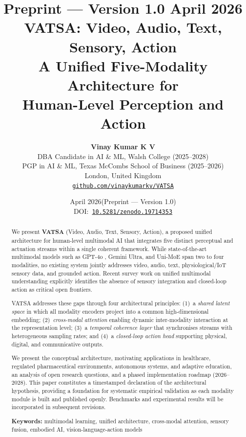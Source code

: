 \documentclass[11pt,a4paper]{article}
\title{%
  \vspace{-1em}
  {\large\textcolor{vatsa-gray}{Preprint --- Version 1.0 \quad April 2026}}\\[0.6em]
  {\LARGE\bfseries VATSA: Video, Audio, Text, Sensory, Action}\\[0.3em]
  {\large A Unified Five-Modality Architecture for\\
   Human-Level Perception and Action}
}
\author{%
  \textbf{Vinay Kumar K V}\\[0.3em]
  DBA Candidate in AI \& ML, Walsh College (2025--2028)\\
  PGP in AI \& ML, Texas McCombs School of Business (2025--2026)\\
  London, United Kingdom\\[0.4em]
  \href{https://github.com/vinaykumarkv/VATSA}{\texttt{github.com/vinaykumarkv/VATSA}}
}
\date{%
  April 2026\quad(Preprint --- Version 1.0)\\[0.3em]
  \small\textcolor{vatsa-gray}{%
    DOI:~\href{https://doi.org/10.5281/zenodo.19714353}%
    {\texttt{10.5281/zenodo.19714353}}
  }%
}
\begin{document}

\maketitle
\thispagestyle{empty}

\begin{abstract}
We present \textbf{VATSA} (Video, Audio, Text, Sensory, Action), a proposed unified
architecture for human-level multimodal AI that integrates five distinct perceptual
and actuation streams within a single coherent framework.  While state-of-the-art
multimodal models such as GPT-4o \citep{openai2024gpt4o}, Gemini Ultra, and
Uni-MoE \citep{li2024unimoe} span two to four modalities, no existing system jointly
addresses video, audio, text, physiological/IoT sensory data, and grounded action.
Recent survey work on unified multimodal understanding \citep{yang2025survey}
explicitly identifies the absence of sensory integration and closed-loop action as
critical open frontiers.

VATSA addresses these gaps through four architectural principles:
(1)~a \emph{shared latent space} in which all modality encoders project into a common
high-dimensional embedding;
(2)~\emph{cross-modal attention} enabling dynamic inter-modality interaction at the
representation level;
(3)~a \emph{temporal coherence layer} that synchronises streams with heterogeneous
sampling rates; and
(4)~a \emph{closed-loop action head} supporting physical, digital, and communicative
outputs.

We present the conceptual architecture, motivating applications in healthcare,
regulated pharmaceutical environments, autonomous systems, and adaptive education,
an analysis of open research questions, and a phased implementation roadmap
(2026--2028).  This paper constitutes a timestamped declaration of the architectural
hypothesis, providing a foundation for systematic empirical validation as each modality
module is built and published openly.  Benchmarks and experimental results will be
incorporated in subsequent revisions.

\medskip
\noindent\textbf{Keywords:} multimodal learning, unified architecture, cross-modal
attention, sensory fusion, embodied AI, vision-language-action models
\end{abstract}

\newpage
\tableofcontents
\newpage

\end{document}
